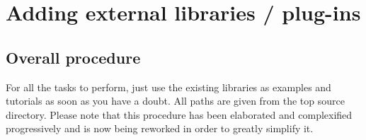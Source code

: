 
\chapter{Adding external libraries / plug-ins}


\section{Overall procedure}

For all the tasks to perform, just use the existing libraries as examples
and tutorials as soon as you have a doubt. All paths are given from
the top source directory. Please note that this procedure has been
elaborated and complexified progressively and is now being reworked
in order to greatly simplify it. \\


